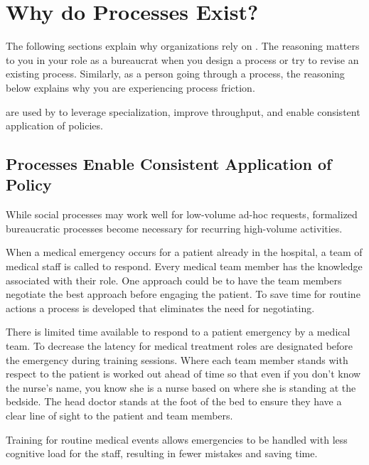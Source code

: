 \section{Why do Processes Exist?\label{sec:why-processes-exist}}


The following sections explain why organizations rely on \iftoggle{glossarysubstitutionworks}{\glspl{process}}{processes}. 
The reasoning matters to you in your role as a bureaucrat when you design a process%
\iftoggle{haspagenumbers}{ (page~\pageref{sec:design-of-processes})}{}
or try to revise an existing process. Similarly, as a person going through a process, the reasoning below explains why you are experiencing \gls{process friction}. 

\iftoggle{glossarysubstitutionworks}{\Glspl{process}}{Processes}
\iftoggle{glossaryinmargin}{\marginpar{[Glossary]}}{}%
are used by 
\iftoggle{glossarysubstitutionworks}{\glspl{bureaucrat}}{bureaucrats}
to leverage specialization, improve throughput, and enable consistent application of policies. 

\subsection*{Processes Enable Consistent Application of Policy}

While social processes may work well for low-volume ad-hoc requests, formalized bureaucratic processes become necessary for recurring high-volume activities.

\begin{mdframed}[frametitle={Emergency Medical Team},frametitlerule=true,frametitlealignment=\centering]
When a medical emergency occurs for a patient already in the hospital, a team of medical staff is called to respond. Every medical team member has the knowledge associated with their role. One approach could be to have the team members negotiate the best approach before engaging the patient. To save time for routine actions a process is developed that eliminates the need for negotiating. 

There is limited time available to respond to a patient emergency by a medical team. To decrease the latency for medical treatment roles are designated before the emergency during training sessions. Where each team member stands with respect to the patient is worked out ahead of time so that even if you don't know the nurse's name, you know she is a nurse based on where she is standing at the bedside. The head doctor stands at the foot of the bed to ensure they have a clear line of sight to the patient and team members.

Training for routine medical events allows emergencies to be handled with less cognitive load for the staff, resulting in fewer mistakes and saving time. 
\end{mdframed}

